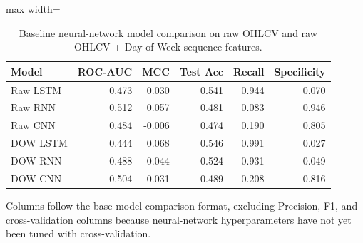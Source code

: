 \begin{table}[htbp]
\centering
\caption{Baseline neural-network model comparison on raw OHLCV and raw OHLCV + Day-of-Week sequence features.}
\label{tab:base_nn_comparison}
\begin{adjustbox}{max width=\linewidth}
\begin{tabular}{lrrrrr}
\toprule
Model & ROC-AUC & MCC & Test Acc & Recall & Specificity \\
\midrule
Raw LSTM & 0.473 & 0.030 & 0.541 & 0.944 & 0.070 \\
Raw RNN & 0.512 & 0.057 & 0.481 & 0.083 & 0.946 \\
Raw CNN & 0.484 & -0.006 & 0.474 & 0.190 & 0.805 \\
DOW LSTM & 0.444 & 0.068 & 0.546 & 0.991 & 0.027 \\
DOW RNN & 0.488 & -0.044 & 0.524 & 0.931 & 0.049 \\
DOW CNN & 0.504 & 0.031 & 0.489 & 0.208 & 0.816 \\
\bottomrule
\end{tabular}
\end{adjustbox}
\par\smallskip
\footnotesize Columns follow the base-model comparison format, excluding Precision, F1, and cross-validation columns because neural-network hyperparameters have not yet been tuned with cross-validation.
\end{table}
